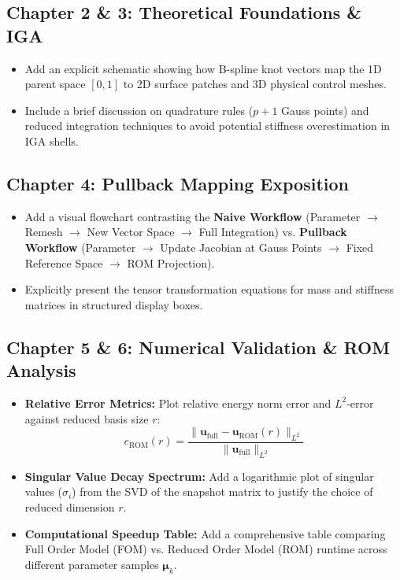 \documentclass[12pt,a4paper]{article}
\newcommand{\vect}[1]{\mathbf{#1}}
\begin{document}
\subsection*{Chapter 2 \& 3: Theoretical Foundations \& IGA}
\begin{itemize}
    \item Add an explicit schematic showing how B-spline knot vectors map the 1D parent space $[0,1]$ to 2D surface patches and 3D physical control meshes.
    \item Include a brief discussion on quadrature rules ($p+1$ Gauss points) and reduced integration techniques to avoid potential stiffness overestimation in IGA shells.
\end{itemize}

\subsection*{Chapter 4: Pullback Mapping Exposition}
\begin{itemize}
    \item Add a visual flowchart contrasting the \textbf{Naive Workflow} (Parameter $\rightarrow$ Remesh $\rightarrow$ New Vector Space $\rightarrow$ Full Integration) vs. \textbf{Pullback Workflow} (Parameter $\rightarrow$ Update Jacobian at Gauss Points $\rightarrow$ Fixed Reference Space $\rightarrow$ ROM Projection).
    \item Explicitly present the tensor transformation equations for mass and stiffness matrices in structured display boxes.
\end{itemize}

\subsection*{Chapter 5 \& 6: Numerical Validation \& ROM Analysis}
\begin{itemize}
    \item \textbf{Relative Error Metrics:} Plot relative energy norm error and $L^2$-error against reduced basis size $r$:
    $$e_{\text{ROM}}(r) = \frac{\|\vect{u}_{\text{full}} - \vect{u}_{\text{ROM}}(r)\|_{L^2}}{\|\vect{u}_{\text{full}}\|_{L^2}}$$
    \item \textbf{Singular Value Decay Spectrum:} Add a logarithmic plot of singular values ($\sigma_i$) from the SVD of the snapshot matrix to justify the choice of reduced dimension $r$.
    \item \textbf{Computational Speedup Table:} Add a comprehensive table comparing Full Order Model (FOM) vs. Reduced Order Model (ROM) runtime across different parameter samples $\boldsymbol{\mu}_k$.
\end{itemize}
\end{document}
